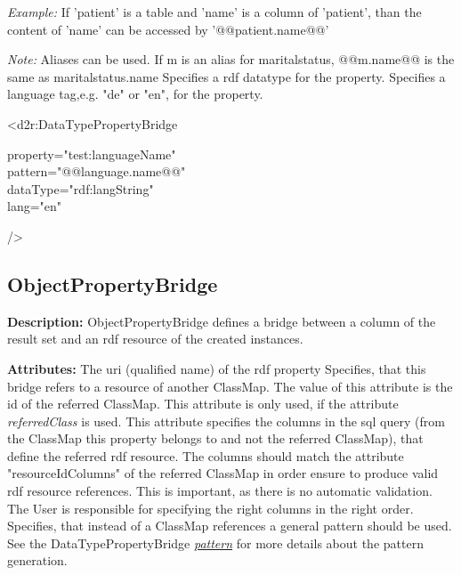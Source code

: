 \emph{Example:}\newline
If 'patient' is a table and 'name' is a column of 'patient', than the content of 'name' can be accessed by '@@patient.name@@'

\emph{Note:} \newline
Aliases can be used. If m is an alias for maritalstatus, @@m.name@@ is the same as maritalstatus.name
\EndAttribute
{}
Specifies a rdf datatype for the property.
\EndAttribute
{}
Specifies a language tag,e.g. "de" or "en", for the property.
\EndAttribute

\begin{ExampleBox}
	<d2r:DataTypePropertyBridge 
	\begin{indention}{1cm}
		property="test:languageName"\\
		pattern="@@language.name@@"\\ 
		dataType="rdf:langString"\\
		lang="en"
	\end{indention}
	/>
\end{ExampleBox}

\subsection{ObjectPropertyBridge}
\textbf{Description:} \newline
ObjectPropertyBridge defines a bridge between a column of the result set and an rdf resource of the created instances.

\textbf{Attributes:} \newline
{}
The uri (qualified name) of the rdf property
\EndAttribute
\label{refferedClassLabel}
Specifies, that this bridge refers to a resource of another ClassMap. 
The value of this attribute is the id of the referred ClassMap.
\EndAttribute
{}
This attribute is only used, if the attribute \emph{referredClass} is used.
This attribute specifies the columns in the sql query (from the ClassMap this property belongs to and not the referred ClassMap), that define the referred rdf resource. The columns should match the attribute "resourceIdColumns" of the referred ClassMap in order ensure to produce valid rdf resource references. This is important, as there is no automatic validation. The User is responsible for specifying the right columns in the right order.
\EndAttribute
{}
Specifies, that instead of a ClassMap references a general pattern should be used. See the DataTypePropertyBridge \hyperref[patternLabel]{\emph{pattern}} 
for more details about the pattern generation.

